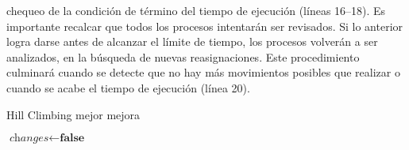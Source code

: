 \documentclass[../informe2.tex]{subfiles}
\begin{document}
chequeo de la condición de término del tiempo de ejecución (líneas 16--18). Es importante recalcar que todos los procesos intentarán ser revisados. Si lo anterior logra darse antes de alcanzar el límite de tiempo, los procesos volverán a ser analizados, en la búsqueda de nuevas reasignaciones. Este procedimiento culminará cuando se detecte que no hay más movimientos posibles que realizar o cuando se acabe el tiempo de ejecución (línea 20).
\begin{algorithm}[h]
	\caption{Hill Climbing mejor mejora}\label{algorithm:HC}
	\begin{algorithmic}[1]
		\Repeat{}
			\State{} $\textit{changes}\gets \textbf{false}$
					\EndIf{}
				\EndFor{}
				\EndIf{}
				\EndIf{}
			\EndFor{}
		\EndProcedure{}
	\end{algorithmic}
\end{algorithm}
\end{document}

